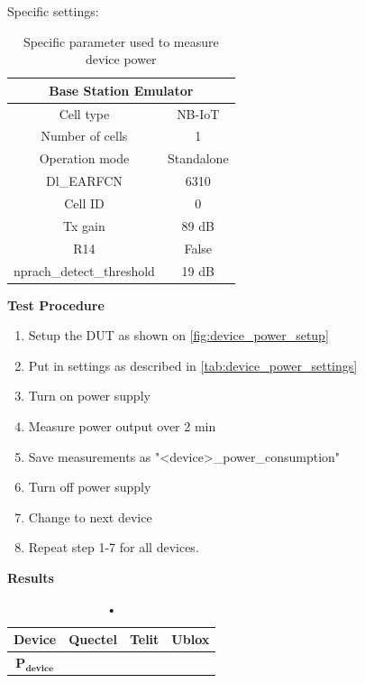 Specific settings:
\begin{table}[H]
\centering
\begin{tabular}{|c|c|} \hline
\multicolumn{2}{|c|}{\textbf{Base Station Emulator}} \\ \hline
Cell type          & NB-IoT         \\ \hline
Number of cells    & 1              \\ \hline
Operation mode     & Standalone     \\ \hline
Dl\_EARFCN         & 6310           \\ \hline
Cell ID            & 0              \\ \hline
Tx gain            & 89 dB          \\ \hline
R14                & False          \\ \hline
nprach\_detect\_threshold  & 19 dB  \\ \hline
\end{tabular}
\caption{Specific parameter used to measure device power}
\label{tab:device_power_settings}
\end{table}


\textbf{Test Procedure}\\
\begin{enumerate}
\item Setup the \gls{DUT} as shown on \autoref{fig:device_power_setup}
\item Put in settings as described in \autoref{tab:device_power_settings} 
\item Turn on power supply 
\item Measure power output over 2 min
\item Save measurements as "<device>\_power\_consumption"
\item Turn off power supply
\item Change to next device
\item Repeat step 1-7 for all devices.
\end{enumerate}

\textbf{Results}\\
\begin{table}[H]
\centering
\begin{tabular}{|c|c|c|c|}\hline
\textbf{Device}	& Quectel	& Telit & Ublox \\ \hline
$\mathbf{P_{device}}$	& & & \\ \hline
\end{tabular}
\caption{•}
\label{tab:device_power_results}
\end{table}

